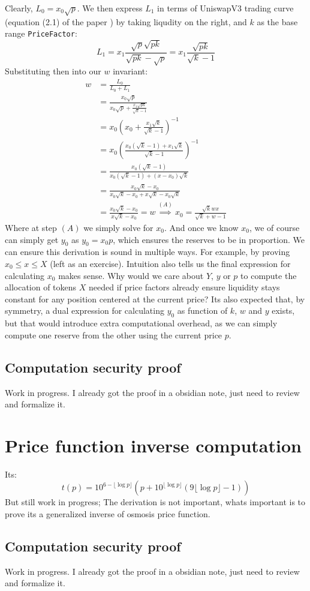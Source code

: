 \documentclass[11pt]{article}
\begin{document}
Clearly, $L_0 = x_0\sqrt p$. We then express $L_1$ in terms of UniswapV3
trading curve (equation (2.1) of the paper \cite{uniswapv3}) by taking
liqudity on the right, and $k$ as the base range \texttt{PriceFactor}:
\[
L_1 = x_1\frac{\sqrt{p}\sqrt{pk}}{\sqrt{pk}-\sqrt{p}}
    = x_1\frac{\sqrt{pk}}{\sqrt k - 1}
\]
Substituting then into our $w$ invariant:
\begin{equation*}
\begin{split}
w &= \frac{L_0}{L_0 + L_1}\\
  &= \frac{x_0\sqrt p}{x_0\sqrt p + \frac{x_1\sqrt{pk}}{\sqrt k - 1}}\\
  &= x_0\left({x_0 + \frac{x_1\sqrt{k}}{\sqrt k - 1}}\right)^{-1}\\
  &= x_0\left(
    \frac{x_0(\sqrt k - 1) + x_1\sqrt k}{\sqrt k - 1}
  \right)^{-1}\\
  &= \frac{x_0(\sqrt k -1)}{x_0(\sqrt k -1) + (x-x_0)\sqrt k}\\
  &= \frac{x_0\sqrt k - x_0}{x_0\sqrt k -x_0 + x\sqrt k - x_0\sqrt k}\\
  &= \frac{x_0\sqrt k - x_0}{x\sqrt k - x_0} =w
  \stackrel{(A)}\implies x_0 = \frac{\sqrt k wx}{\sqrt k + w - 1}
\end{split}
\end{equation*}
Where at step $(A)$ we simply solve for $x_0$. And once we know $x_0$,
we of course can simply get $y_0$ as $y_0 = x_0p$, which ensures the
reserves to be in proportion. We can ensure this derivation is sound
in multiple ways. For example, by proving $x_0 \leq x \leq X$ (left as an exercise).
Intuition also tells us the final expression for calculating $x_0$ makes sense.
Why would we care about $Y$, $y$ or $p$ to compute the allocation of tokens $X$
needed if price factors already ensure liquidity stays constant for any position
centered at the current price? Its also expected that, by symmetry, a dual expression
for calculating $y_0$ as function of $k$, $w$ and $y$ exists, but that would 
introduce extra computational overhead, as we can simply compute one reserve from
the other using the current price $p$.


\subsection{Computation security proof}
Work in progress. I already got the proof in a obsidian note, just need
to review and formalize it.

\section{Price function inverse computation}
Its:
\[
t(p) = 10^{6-\lfloor\log p\rfloor} \left(
	p+10^{\lfloor\log p\rfloor}\left(
		9\lfloor\log p\rfloor-1
	\right)
\right)
\]
But still work in progress; The derivation is not important, whats important
is to prove its a generalized inverse of osmosis price function.
\subsection{Computation security proof}
Work in progress. I already got the proof in a obsidian note, just need
to review and formalize it.

\break


\end{document}
